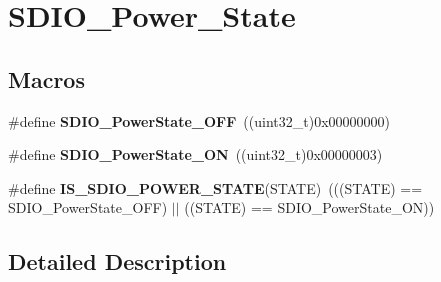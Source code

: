 \hypertarget{group___s_d_i_o___power___state}{}\section{S\+D\+I\+O\+\_\+\+Power\+\_\+\+State}
\label{group___s_d_i_o___power___state}
\subsection*{Macros}
\begin{DoxyCompactItemize}
\item 
\hypertarget{group___s_d_i_o___power___state_gab2f36a68fc50795ea74a7e98b4ac2d37}{}\#define {\bfseries S\+D\+I\+O\+\_\+\+Power\+State\+\_\+\+O\+F\+F}~((uint32\+\_\+t)0x00000000)\label{group___s_d_i_o___power___state_gab2f36a68fc50795ea74a7e98b4ac2d37}

\item 
\hypertarget{group___s_d_i_o___power___state_ga0aacd8c94effe8066c6d447fc884d217}{}\#define {\bfseries S\+D\+I\+O\+\_\+\+Power\+State\+\_\+\+O\+N}~((uint32\+\_\+t)0x00000003)\label{group___s_d_i_o___power___state_ga0aacd8c94effe8066c6d447fc884d217}

\item 
\hypertarget{group___s_d_i_o___power___state_gad0dae767c2024de1769efb1feccc14ef}{}\#define {\bfseries I\+S\+\_\+\+S\+D\+I\+O\+\_\+\+P\+O\+W\+E\+R\+\_\+\+S\+T\+A\+T\+E}(S\+T\+A\+T\+E)~(((S\+T\+A\+T\+E) == S\+D\+I\+O\+\_\+\+Power\+State\+\_\+\+O\+F\+F) $\vert$$\vert$ ((S\+T\+A\+T\+E) == S\+D\+I\+O\+\_\+\+Power\+State\+\_\+\+O\+N))\label{group___s_d_i_o___power___state_gad0dae767c2024de1769efb1feccc14ef}

\end{DoxyCompactItemize}


\subsection{Detailed Description}
